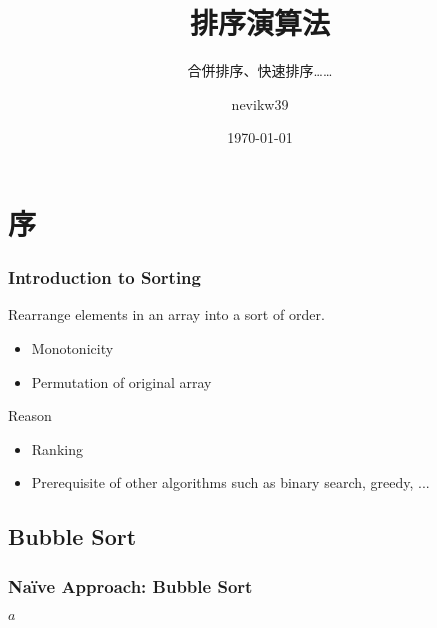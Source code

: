 \documentclass{beamer}
\title{排序演算法}
\subtitle{合併排序、快速排序……}
\author{nevikw39}
\institute{點石學園}
\date{\today}
\begin{document}
\frame{\titlepage}

\frame{\tableofcontents}

\section{序}

\frame
{
	\frametitle{Introduction to Sorting}
	
	\begin{definition}[Sort]
		Rearrange elements in an array into a sort of order.
		
		\begin{itemize}
			\item Monotonicity
			\item Permutation of original array
		\end{itemize}
	\end{definition}
	\pause
	
	\begin{block}{Reason}
		\begin{itemize}
			\item Ranking
			\item Prerequisite of other algorithms such as binary search, greedy, ...
		\end{itemize}
	\end{block}
}

%	
%	

\subsection{Bubble Sort}

\frame
{
	\frametitle{Na\"{i}ve Approach: Bubble Sort}
	
	\begin{algorithmic}
            \For{$i\in[0, n-1)$}
                \For{$j\in[0, n-1-i)$}
						\State{}
					\EndIf
				\EndFor
            \EndFor
            \State\Return$a$
        \EndProcedure
	\end{algorithmic}
}
\end{document}
